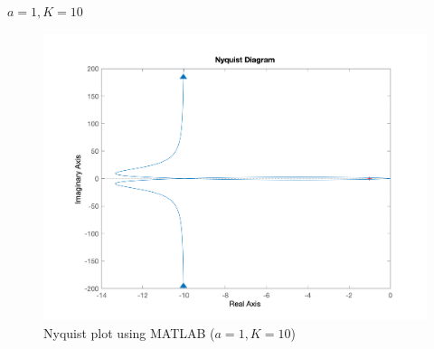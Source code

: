 \begin{itemize}
	$a = 1, K = 10$
	\begin{figure}[H]
		\caption{Nyquist plot using MATLAB ($a = 1, K = 10$)}
		\centering
		\includegraphics[width=12cm]{../Figure/Q2/MATLAB-Nyquist_K_bigger.png}
	\end{figure}
\end{itemize}


